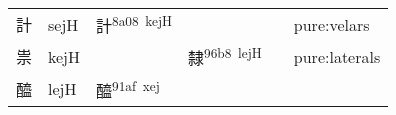 \documentclass[14pt,a4paper]{scrartcl}
\begin{document}
\begin{longtable}[c]{@{}llllll@{}}
\begin{minipage}[t]{0.14\columnwidth}\raggedright\strut
計
\strut\end{minipage} &
\begin{minipage}[t]{0.14\columnwidth}\raggedright\strut
sejH
\strut\end{minipage} &
\begin{minipage}[t]{0.14\columnwidth}\raggedright\strut
計\textsuperscript{8a08~kejH}
\strut\end{minipage} &
\begin{minipage}[t]{0.14\columnwidth}\raggedright\strut
\strut\end{minipage} &
\begin{minipage}[t]{0.14\columnwidth}\raggedright\strut
\strut\end{minipage} &
\begin{minipage}[t]{0.14\columnwidth}\raggedright\strut
pure:velars
\strut\end{minipage}\tabularnewline
\begin{minipage}[t]{0.14\columnwidth}\raggedright\strut
祟
\strut\end{minipage} &
\begin{minipage}[t]{0.14\columnwidth}\raggedright\strut
kejH
\strut\end{minipage} &
\begin{minipage}[t]{0.14\columnwidth}\raggedright\strut
\strut\end{minipage} &
\begin{minipage}[t]{0.14\columnwidth}\raggedright\strut
隸\textsuperscript{96b8~lejH}
\strut\end{minipage} &
\begin{minipage}[t]{0.14\columnwidth}\raggedright\strut
\strut\end{minipage} &
\begin{minipage}[t]{0.14\columnwidth}\raggedright\strut
pure:laterals
\strut\end{minipage}\tabularnewline
\begin{minipage}[t]{0.14\columnwidth}\raggedright\strut
醯
\strut\end{minipage} &
\begin{minipage}[t]{0.14\columnwidth}\raggedright\strut
lejH
\strut\end{minipage} &
\begin{minipage}[t]{0.14\columnwidth}\raggedright\strut
醯\textsuperscript{91af~xej}
\strut\end{minipage} &
\begin{minipage}[t]{0.14\columnwidth}\raggedright\strut

\end{minipage}
\end{longtable}
\end{document}
